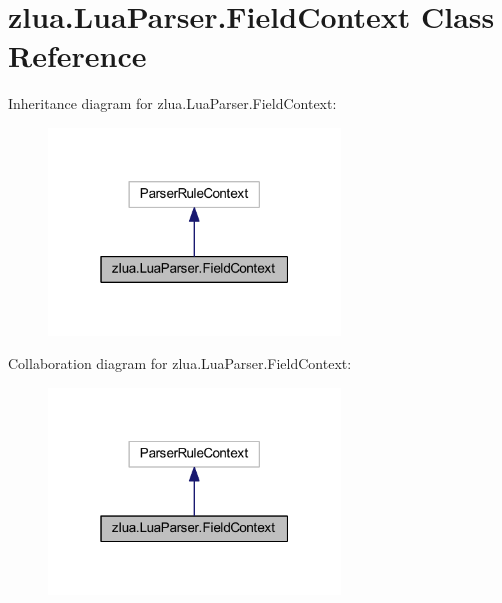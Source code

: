 \hypertarget{classzlua_1_1_lua_parser_1_1_field_context}{}\section{zlua.\+Lua\+Parser.\+Field\+Context Class Reference}
\label{classzlua_1_1_lua_parser_1_1_field_context}


Inheritance diagram for zlua.\+Lua\+Parser.\+Field\+Context\+:
\nopagebreak
\begin{figure}[H]
\begin{center}
\leavevmode
\includegraphics[width=220pt]{classzlua_1_1_lua_parser_1_1_field_context__inherit__graph}
\end{center}
\end{figure}


Collaboration diagram for zlua.\+Lua\+Parser.\+Field\+Context\+:
\nopagebreak
\begin{figure}[H]
\begin{center}
\leavevmode
\includegraphics[width=220pt]{classzlua_1_1_lua_parser_1_1_field_context__coll__graph}
\end{center}
\end{figure}
